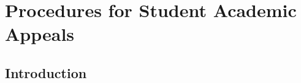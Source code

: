 \documentclass[12pt]{article}
\newcommand{\di}[1]{#1}
\newcommand{\fixme}[1]{\color{fixmeColor}$\{$#1$\}$\color{black}\index{$>>>>$FIXME$<<<<$}}
\newcommand{\parnum}{\arabic{parcount}}
\newcounter{parcount}
\newcommand\p{\stepcounter{parcount}\leavevmode{\raisebox{0.2ex}{\scriptsize[\parnum]}}\hspace{0.2em}}
\newcommand\cp{\setcounter{parcount}{0}}
\newcommand{\supervisor}{Supervisor\xspace}
\newcommand{\GC}{Graduate Coordinator\xspace}
\begin{document}
% 
% 
%
%
%
%


\section{Procedures for Student Academic Appeals}

\subsection{Introduction}

\cp
\end{document}
